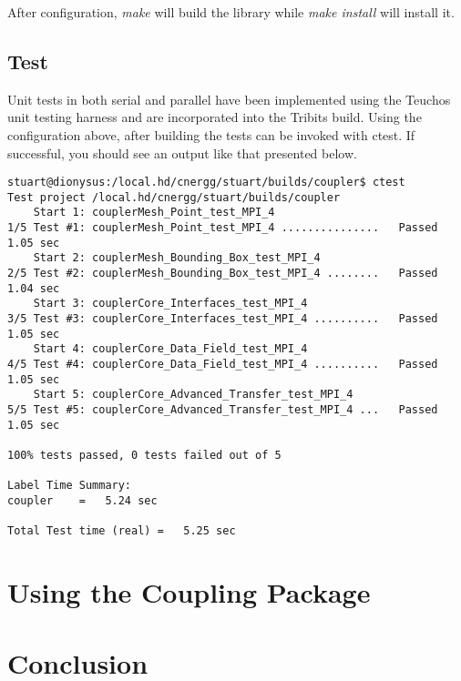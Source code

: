 \documentclass[letterpaper]{article}
\begin{document}
After configuration, {\sl make} will build the library while {\sl make
  install} will install it.

\subsection{Test}
Unit tests in both serial and parallel have been implemented using the
Teuchos unit testing harness and are incorporated into the Tribits
build. Using the configuration above, after building the tests can be
invoked with ctest. If successful, you should see an output like that
presented below.

\begin{verbatim}
stuart@dionysus:/local.hd/cnergg/stuart/builds/coupler$ ctest
Test project /local.hd/cnergg/stuart/builds/coupler
    Start 1: couplerMesh_Point_test_MPI_4
1/5 Test #1: couplerMesh_Point_test_MPI_4 ...............   Passed    1.05 sec
    Start 2: couplerMesh_Bounding_Box_test_MPI_4
2/5 Test #2: couplerMesh_Bounding_Box_test_MPI_4 ........   Passed    1.04 sec
    Start 3: couplerCore_Interfaces_test_MPI_4
3/5 Test #3: couplerCore_Interfaces_test_MPI_4 ..........   Passed    1.05 sec
    Start 4: couplerCore_Data_Field_test_MPI_4
4/5 Test #4: couplerCore_Data_Field_test_MPI_4 ..........   Passed    1.05 sec
    Start 5: couplerCore_Advanced_Transfer_test_MPI_4
5/5 Test #5: couplerCore_Advanced_Transfer_test_MPI_4 ...   Passed    1.05 sec

100% tests passed, 0 tests failed out of 5

Label Time Summary:
coupler    =   5.24 sec

Total Test time (real) =   5.25 sec
\end{verbatim}

\section{Using the Coupling Package}

\section{Conclusion}

\pagebreak


\end{document}
